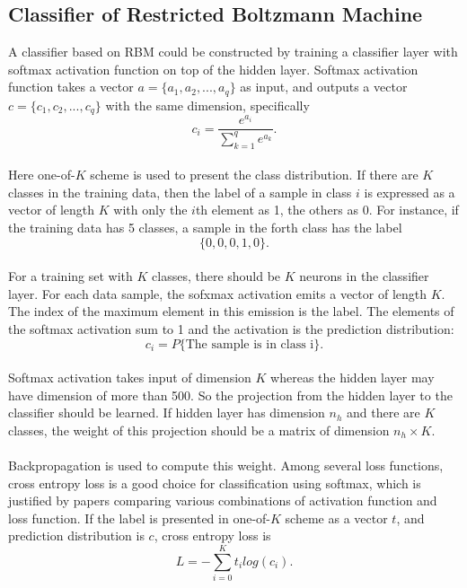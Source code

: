 \documentclass[12pt]{article}
\begin{document}
\subsection{Classifier of Restricted Boltzmann Machine}
A classifier based on RBM could be constructed by training a classifier layer with softmax activation function on top of the hidden layer. Softmax activation function takes a vector $a = \{a_1, a_2,..., a_q\}$ as input, and outputs a vector $c = \{c_1, c_2,..., c_q\}$ with the same dimension, specifically\begin{equation}
c_i = \frac{e^{a_i}}{\sum_{k=1}^q e^{a_k}}.
\end{equation}
\\
Here one-of-$K$ scheme is used to present the class distribution. If there are $K$ classes in the training data, then the label of a sample in class $i$ is expressed as a vector of length $K$ with only the $i$th element as 1, the others as 0. For instance, if the training data has 5 classes, a sample in the forth class has the label\begin{equation}
\{0,0,0,1,0\}.
\end{equation}
\\
For a training set with $K$ classes, there should be $K$ neurons in the classifier layer. For each data sample, the sofxmax activation emits a vector of length $K$. The index of the maximum element in this emission is the label. The elements of the  softmax activation sum to 1 and the activation is the prediction distribution:\begin{equation}
c_i = P\{\text{The sample is in class i}\}.
\end{equation}
\\
Softmax activation takes input of dimension $K$ whereas the hidden layer may have dimension of more than 500. So the projection from the hidden layer to the classifier should be learned. If hidden layer has dimension $n_h$ and there are $K$ classes, the weight of this projection should be a matrix of dimension $n_h\times K$.\\
\\
Backpropagation is used to compute this weight. Among several loss functions, cross entropy loss is a good choice for classification using softmax, which is justified by papers comparing various combinations of activation function and loss function. If the label is presented in one-of-$K$ scheme as a vector $t$, and prediction distribution is $c$,  cross entropy loss is \begin{equation}
L = -\sum_{i = 0}^K t_i log(c_i).
\end{equation}
\end{document}
